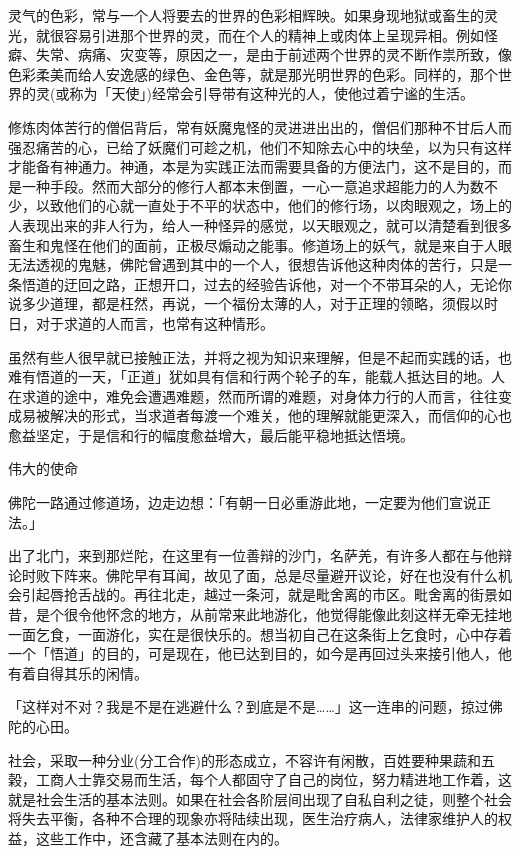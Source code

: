 \documentclass[12pt,twoside,openany]{book}
\begin{document}
灵气的色彩，常与一个人将要去的世界的色彩相辉映。如果身现地狱或畜生的灵光，就很容易引进那个世界的灵，而在个人的精神上或肉体上呈现异相。例如怪癖、失常、病痛、灾变等，原因之一，是由于前述两个世界的灵不断作祟所致，像色彩柔美而给人安逸感的绿色、金色等，就是那光明世界的色彩。同样的，那个世界的灵(或称为「天使」)经常会引导带有这种光的人，使他过着宁谧的生活。

修炼肉体苦行的僧侣背后，常有妖魔鬼怪的灵进进出出的，僧侣们那种不甘后人而强忍痛苦的心，已给了妖魔们可趁之机，他们不知除去心中的块垒，以为只有这样才能备有神通力。神通，本是为实践正法而需要具备的方便法门，这不是目的，而是一种手段。然而大部分的修行人都本末倒置，一心一意追求超能力的人为数不少，以致他们的心就一直处于不平的状态中，他们的修行场，以肉眼观之，场上的人表现出来的非人行为，给人一种怪异的感觉，以天眼观之，就可以清楚看到很多畜生和鬼怪在他们的面前，正极尽煽动之能事。修道场上的妖气，就是来自于人眼无法透视的鬼魅，佛陀曾遇到其中的一个人，很想告诉他这种肉体的苦行，只是一条悟道的迂回之路，正想开口，过去的经验告诉他，对一个不带耳朵的人，无论你说多少道理，都是枉然，再说，一个福份太薄的人，对于正理的领略，须假以时日，对于求道的人而言，也常有这种情形。

虽然有些人很早就已接触正法，并将之视为知识来理解，但是不起而实践的话，也难有悟道的一天，「正道」犹如具有信和行两个轮子的车，能载人抵达目的地。人在求道的途中，难免会遭遇难题，然而所谓的难题，对身体力行的人而言，往往变成易被解决的形式，当求道者每渡一个难关，他的理解就能更深入，而信仰的心也愈益坚定，于是信和行的幅度愈益增大，最后能平稳地抵达悟境。

伟大的使命

佛陀一路通过修道场，边走边想：「有朝一日必重游此地，一定要为他们宣说正法。」

出了北门，来到那烂陀，在这里有一位善辩的沙门，名萨羌，有许多人都在与他辩论时败下阵来。佛陀早有耳闻，故见了面，总是尽量避开议论，好在也没有什么机会引起唇抢舌战的。再往北走，越过一条河，就是毗舍离的市区。毗舍离的街景如昔，是个很令他怀念的地方，从前常来此地游化，他觉得能像此刻这样无牵无挂地一面乞食，一面游化，实在是很快乐的。想当初自己在这条街上乞食时，心中存着一个「悟道」的目的，可是现在，他已达到目的，如今是再回过头来接引他人，他有着自得其乐的闲情。

「这样对不对？我是不是在逃避什么？到底是不是……」这一连串的问题，掠过佛陀的心田。

社会，采取一种分业(分工合作)的形态成立，不容许有闲散，百姓要种果蔬和五榖，工商人士靠交易而生活，每个人都固守了自己的岗位，努力精进地工作着，这就是社会生活的基本法则。如果在社会各阶层间出现了自私自利之徒，则整个社会将失去平衡，各种不合理的现象亦将陆续出现，医生治疗病人，法律家维护人的权益，这些工作中，还含藏了基本法则在内的。
\end{document}
